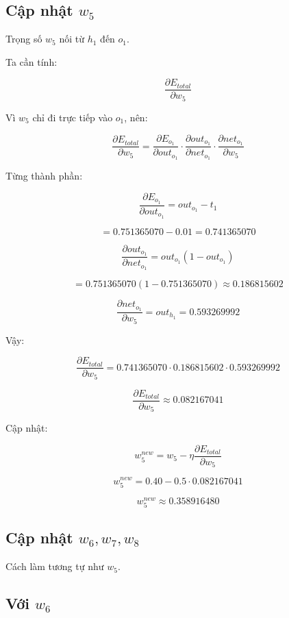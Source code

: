 \subsection{Cập nhật $w_5$}

Trọng số $w_5$ nối từ $h_1$ đến $o_1$.

Ta cần tính:

\[
    \frac{\partial E_{total}}{\partial w_5}
\]

Vì $w_5$ chỉ đi trực tiếp vào $o_1$, nên:

\[
    \frac{\partial E_{total}}{\partial w_5}
    =
    \frac{\partial E_{o_1}}{\partial out_{o_1}}
    \cdot
    \frac{\partial out_{o_1}}{\partial net_{o_1}}
    \cdot
    \frac{\partial net_{o_1}}{\partial w_5}
\]

Từng thành phần:

\[
    \frac{\partial E_{o_1}}{\partial out_{o_1}}
    =
    out_{o_1}-t_1
\]

\[
    =
    0.751365070-0.01
    =
    0.741365070
\]

\[
    \frac{\partial out_{o_1}}{\partial net_{o_1}}
    =
    out_{o_1}(1-out_{o_1})
\]

\[
    =
    0.751365070(1-0.751365070)
    \approx 0.186815602
\]

\[
    \frac{\partial net_{o_1}}{\partial w_5}
    =
    out_{h_1}
    =
    0.593269992
\]

Vậy:

\[
    \frac{\partial E_{total}}{\partial w_5}
    =
    0.741365070
    \cdot
    0.186815602
    \cdot
    0.593269992
\]

\[
    \frac{\partial E_{total}}{\partial w_5}
    \approx 0.082167041
\]

Cập nhật:

\[
    w_5^{new}
    =
    w_5
    -
    \eta
    \frac{\partial E_{total}}{\partial w_5}
\]

\[
    w_5^{new}
    =
    0.40
    -
    0.5\cdot 0.082167041
\]

\[
    w_5^{new}
    \approx 0.358916480
\]

\subsection{Cập nhật $w_6,w_7,w_8$}

Cách làm tương tự như $w_5$.

\subsection*{Với $w_6$}

